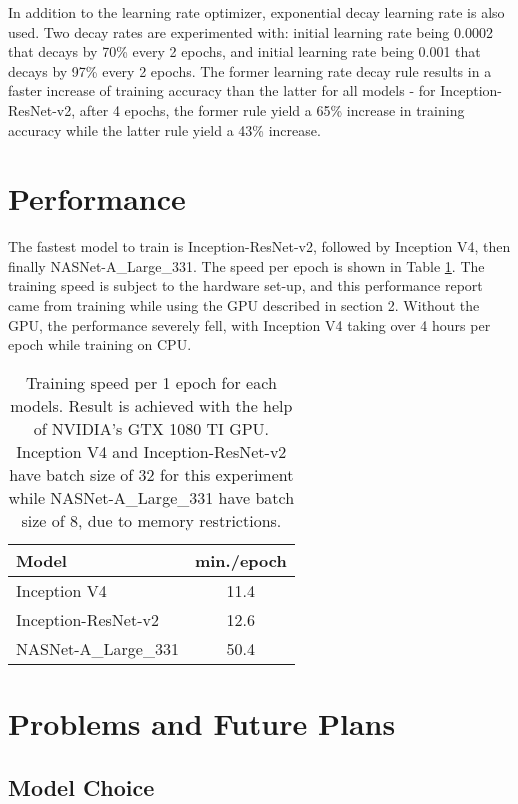 \documentclass[a4paper]{article}
\begin{document}
In addition to the learning rate optimizer, exponential decay learning rate is also used. Two decay rates are experimented with: initial learning rate being 0.0002 that decays by 70\% every 2 epochs, and initial learning rate being 0.001 that decays by 97\% every 2 epochs. The former learning rate decay rule results in a faster increase of training accuracy than the latter for all models - for Inception-ResNet-v2, after 4 epochs, the former rule yield a 65\% increase in training accuracy while the latter rule yield a 43\% increase.

\section{Performance}

The fastest model to train is Inception-ResNet-v2, followed by Inception V4, then finally NASNet-A\_Large\_331. The speed per epoch is shown in Table \ref{tab:perf}. The training speed is subject to the hardware set-up, and this performance report came from training while using the GPU described in section 2. Without the GPU, the performance severely fell, with Inception V4 taking over 4 hours per epoch while training on CPU.

\begin{table}
\centering
\begin{tabular}{l|c}
Model & min./epoch \\\hline
Inception V4 \cite{Szegedy2016} & 11.4 \\
Inception-ResNet-v2 \cite{Szegedy2016} & 12.6 \\
NASNet-A\_Large\_331 \cite{Zoph2017} & 50.4 \\
\end{tabular}
\caption{\label{tab:perf}Training speed per 1 epoch for each models. Result is achieved with the help of NVIDIA's GTX 1080 TI GPU. Inception V4 and Inception-ResNet-v2 have batch size of 32 for this experiment while NASNet-A\_Large\_331 have batch size of 8, due to memory restrictions.}
\end{table}

\section{Problems and Future Plans}

\subsection{Model Choice}
\end{document}
